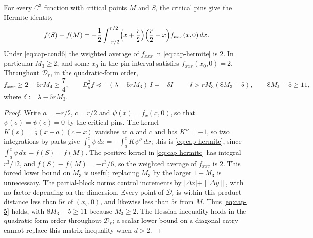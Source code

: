 \begin{lemma}\label{lem:cap-forced}
For every $C^3$ function with critical points $M$ and $S$, the critical pins give the Hermite identity
\begin{equation}\label{eq:cap-hermite}
f(S)-f(M)=-\frac12\int_{-r/2}^{r/2}\Bigl(x+\frac r2\Bigr)\Bigl(\frac r2-x\Bigr)f_{xxx}(x,0)\,dx .
\end{equation}
Under \eqref{eq:cap-cond6} the weighted average of $f_{xxx}$ in \eqref{eq:cap-hermite} is $2$. In particular $M_3\ge2$, and some $x_0$ in the pin interval satisfies $f_{xxx}(x_0,0)=2$. Throughout $\mathcal D_r$, in the quadratic-form order,
\begin{equation}\label{eq:cap-5}
f_{xxx}\ge2-5rM_4\ge\frac74,\qquad D_y^2f\preceq-(\lambda-5rM_3)\,I=-\delta I,\qquad \delta>rM_3(8M_3-5),\qquad 8M_3-5\ge11 ,
\end{equation}
where $\delta:=\lambda-5rM_3$.
\end{lemma}

\begin{proof}
Write $a=-r/2$, $c=r/2$ and $\psi(x)=f_x(x,0)$, so that $\psi(a)=\psi(c)=0$ by the critical pins. The kernel $K(x)=\frac12(x-a)(c-x)$ vanishes at $a$ and $c$ and has $K''=-1$, so two integrations by parts give $\int_a^c\psi\,dx=-\int_a^cK\psi''\,dx$; this is \eqref{eq:cap-hermite}, since $\int_a^c\psi\,dx=f(S)-f(M)$. The positive kernel in \eqref{eq:cap-hermite} has integral $r^3/12$, and $f(S)-f(M)=-r^3/6$, so the weighted average of $f_{xxx}$ is $2$. This forced lower bound on $M_3$ is useful; replacing $M_3$ by the larger $1+M_3$ is unnecessary. The partial-block norms control increments by $|\Delta x|+\|\Delta y\|$, with no factor depending on the dimension. Every point of $\mathcal D_r$ is within this product distance less than $5r$ of $(x_0,0)$, and likewise less than $5r$ from $M$. Thus \eqref{eq:cap-5} holds, with $8M_3-5\ge11$ because $M_3\ge2$. The Hessian inequality holds in the quadratic-form order throughout $\mathcal D_r$; a scalar lower bound on a diagonal entry cannot replace this matrix inequality when $d>2$.
\end{proof}


